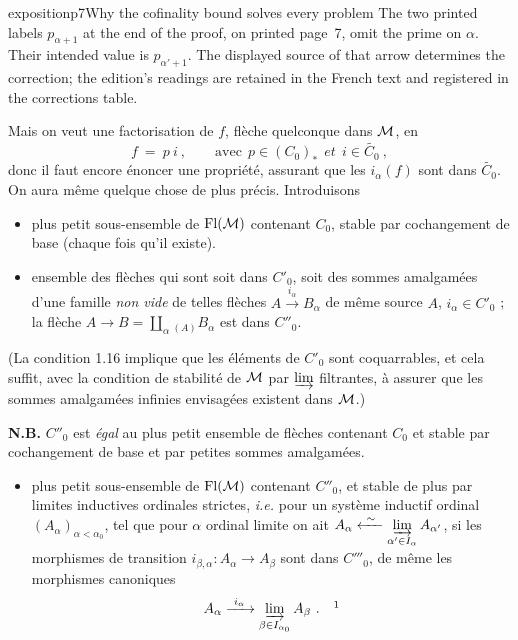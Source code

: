 \begin{dcomment}{exposition}{p7}{Why the cofinality bound solves every problem}
The two printed labels $p_{\alpha+1}$ at the end of the proof, on printed page~7, omit the prime on $\alpha$. Their intended value is $p_{\alpha'+1}$. The displayed source of that arrow determines the correction; the edition's readings are retained in the French text and registered in the corrections table.
\end{dcomment}


Mais on veut une factorisation de $f$, flèche quelconque dans $\mathcal{M}$, en
\[
f \ = \ p\ i \ , \qquad \text{avec} \ \ p \in (C_0)_* \ \ \textit{et} \ \ i \in \widetilde{C_0} \ ,
\]
donc il faut encore énoncer une propriété, assurant que les $i_\alpha(f)$ sont dans $\widetilde{C_0}$. On aura même quelque chose de plus précis. Introduisons

\begin{itemize}[leftmargin=10em, labelwidth=9em, labelsep=1em, align=left]
\item[(1.18)\hfill $C'_0 \ = $] plus petit sous-ensemble de $\mathrm{Fl}(\mathcal{M})$ contenant $C_0$, stable par cochangement de base (chaque fois qu'il existe).
\item[\hfill $C''_0 \ = $] ensemble des flèches qui sont soit dans $C'_0$, soit des sommes amalgamées d'une famille \textit{non vide} de telles flèches $A \xrightarrow{i_\alpha} B_\alpha$ de même source $A$, $i_\alpha \in C'_0$ ; la flèche $A \longrightarrow B = \displaystyle\coprod_{\alpha}{}_{(A)} B_\alpha$ est dans $C''_0$.
\end{itemize}

(La condition 1.16 implique que les éléments de $C'_0$ sont coquarrables, et cela suffit, avec la condition de stabilité de $\mathcal{M}$ par $\varinjlim$ filtrantes, à assurer que les sommes amalgamées infinies envisagées existent dans $\mathcal{M}$.)

\textbf{N.B.} $C''_0$ est \textit{égal} au plus petit ensemble de flèches contenant $C_0$ et stable par cochangement de base et par petites sommes amalgamées.

\setcounter{footnote}{1}%
\begin{itemize}[leftmargin=10em, labelwidth=9em, labelsep=1em, align=left]
\item[(1.19)\hfill $C'''_0 \ = $] plus petit sous-ensemble de $\mathrm{Fl}(\mathcal{M})$ contenant $C''_0$, et stable de plus par limites inductives ordinales strictes, \textit{i.e.} pour un système inductif ordinal $(A_\alpha)_{\alpha<\alpha_0}$, tel que pour $\alpha$ ordinal limite on ait $A_\alpha \xleftarrow{\ \sim\ } \varinjlim\limits_{\alpha' \in I_\alpha} A_{\alpha'}$, si les morphismes de transition $i_{\beta,\alpha} : A_\alpha \longrightarrow A_\beta$ sont dans $C'''_0$, de même les morphismes canoniques
\[
A_\alpha \xrightarrow{\ i_\alpha\ } \varinjlim_{\beta \in I_{\alpha_0}} A_\beta \ . \quad \footnotemark
\]
\end{itemize}

